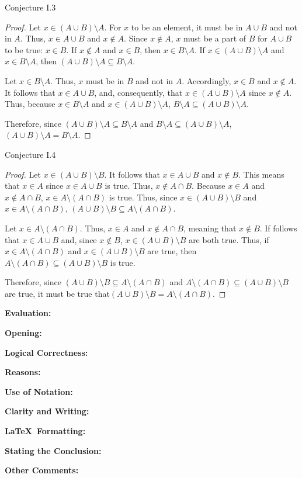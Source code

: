 \documentclass[11pt,titlepage]{article}		%
\def\rubric{\textbf{Evaluation:} \makebox[0.75in]{\hrulefill}

\vspace{.3in}

\textbf{Opening:} \makebox[0.75in]{\hrulefill}

\vspace{.3in}

\textbf{Logical Correctness:} \makebox[0.75in]{\hrulefill}

\vspace{.3in}

\textbf{Reasons:} \makebox[0.75in]{\hrulefill}

\vspace{.3in}

\textbf{Use of Notation:} \makebox[0.75in]{\hrulefill}

\vspace{.3in}

\textbf{Clarity and Writing:} \makebox[0.75in]{\hrulefill}

\vspace{.3in}

\textbf{\LaTeX\ Formatting:} \makebox[0.75in]{\hrulefill}

\vspace{.3in}

\textbf{Stating the Conclusion:} \makebox[0.75in]{\hrulefill}

\vspace{.3in}

\textbf{Other Comments:}

\vspace{1in}

}
\theoremstyle{theorem}
\begin{document}
Conjecture I.3
\begin{proof}
Let $x\in (A \cup B)\setminus A$. For $x$ to be an element, it must be in $A\cup B$ and not in $A$. Thus, $x\in A\cup B$ and $x\not\in A$. Since $x\not\in A$, $x$ must be a part of $B$ for $A\cup B$ to be true: $x\in B$. If $x\not\in A$ and $x\in B$, then $x\in B\setminus A$. If $x\in (A \cup B)\setminus A$ and $x\in B\setminus A$, then $(A \cup B)\setminus A \subseteq B \setminus A$.

Let $x\in B\setminus A$. Thus, $x$ must be in $B$ and not in $A$. Accordingly, $x\in B$ and $x\not\in A$. It follows that $x \in A\cup B$, and, consequently, that $x \in (A \cup B)\setminus A$ since $x \not \in A$. Thus, because $x\in B \setminus A$ and $x \in (A \cup B)\setminus A$, $B\setminus A \subseteq (A\cup B)\setminus A$.

Therefore, since $(A \cup B)\setminus A \subseteq B \setminus A$ and $B\setminus A \subseteq (A\cup B)\setminus A$, $(A \cup B)\setminus A = B \setminus A$.
\end{proof}

Conjecture I.4
\begin{proof}
Let $x \in (A \cup B) \setminus B$. It follows that $x \in A\cup B$ and $x\not\in B$. This means that $x\in A$ since $x\in A\cup B$ is true. Thus, $x\not\in A\cap B$. Because $x\in A$ and $x\not\in A \cap B$, $x\in A\setminus (A\cap B)$ is true. Thus, since $x\in (A \cup B) \setminus B$ and $x\in A\setminus (A\cap B)$, $ (A\cup B) \setminus B \subseteq A\setminus (A \cap B)$.

Let $x \in A\setminus(A\cap B)$. Thus, $x \in A$ and $x \not \in A \cap B$, meaning that $x \not\in B$. If follows that $x \in A \cup B$ and, since $x \not \in B$, $ x\in (A \cup B)\setminus B$ are both true. Thus, if $x \in A\setminus(A\cap B)$ and $ x\in (A \cup B)\setminus B$ are true, then $A\setminus(A\cap B) \subseteq (A \cup B)\setminus B$ is true.

Therefore, since $ (A\cup B) \setminus B \subseteq A\setminus (A \cap B)$ and $A\setminus(A\cap B) \subseteq (A \cup B)\setminus B$ are true, it must be true that$ (A\cup B) \setminus B = A\setminus (A \cap B)$.
\end{proof}


\rubric
\end{document}
